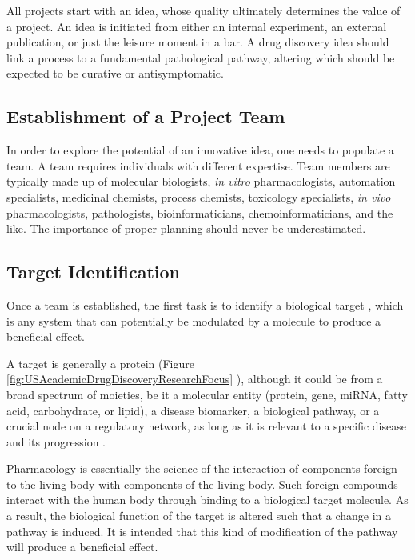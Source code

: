 All projects start with an idea, whose quality ultimately determines the value of a project. An idea is initiated from either an internal experiment, an external publication, or just the leisure moment in a bar. A drug discovery idea should link a process to a fundamental pathological pathway, altering which should be expected to be curative or antisymptomatic.

\subsection{Establishment of a Project Team}

In order to explore the potential of an innovative idea, one needs to populate a team. A team requires individuals with different expertise. Team members are typically made up of molecular biologists, \textit{in vitro} pharmacologists, automation specialists, medicinal chemists, process chemists, toxicology specialists, \textit{in vivo} pharmacologists, pathologists, bioinformaticians, chemoinformaticians, and the like. The importance of proper planning should never be underestimated.

\subsection{Target Identification}

Once a team is established, the first task is to identify a biological target \citep{706-2009,355-2010,356-2010,357-2009,358-2011}, which is any system that can potentially be modulated by a molecule to produce a beneficial effect.

A target is generally a protein (Figure \ref{fig:USAcademicDrugDiscoveryResearchFocus} \citep{721-2011}), although it could be from a broad spectrum of moieties, be it a molecular entity (protein, gene, miRNA, fatty acid, carbohydrate, or lipid), a disease biomarker, a biological pathway, or a crucial node on a regulatory network, as long as it is relevant to a specific disease and its progression \citep{711-2008}.

Pharmacology is essentially the science of the interaction of components foreign to the living body with components of the living body. Such foreign compounds interact with the human body through binding to a biological target molecule. As a result, the biological function of the target is altered such that a change in a pathway is induced. It is intended that this kind of modification of the pathway will produce a beneficial effect.

